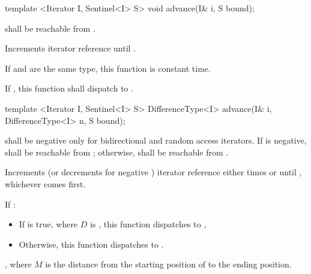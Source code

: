 \begin{addedblock}
\begin{itemdecl}
template <Iterator I, Sentinel<I> S>
  void advance(I& i, S bound);
\end{itemdecl}

\begin{itemdescr}
\pnum
\requires
{} shall be reachable from .

\pnum
\effects
Increments iterator reference  until
.

\pnum
If  and  are the same type, this function
is constant time.

\pnum
If  
, this function shall dispatch to .
\end{itemdescr}

\begin{itemdecl}
template <Iterator I, Sentinel<I> S>
  DifferenceType<I> advance(I& i, DifferenceType<I> n, S bound);
\end{itemdecl}

\begin{itemdescr}
\pnum
\requires
{}
shall be negative only for bidirectional and random access iterators. If  is
negative,  shall be reachable from ; otherwise, 
shall be reachable from .

\pnum
\effects
Increments (or decrements for negative ) iterator reference  either
 times or until , whichever comes first.

\pnum
If  
:

\begin{itemize}
\item If  is true, where $D$ is ,
this function dispatches to ,
\item Otherwise, this function dispatches to .
\end{itemize}

\pnum
\returns
{}, where $M$ is the distance from the starting position of  to
the ending position.
\end{itemdescr}
\end{addedblock}


